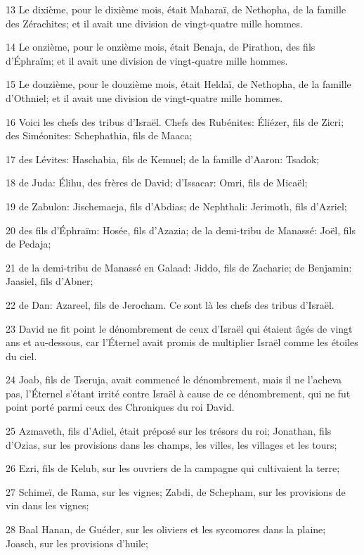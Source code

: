 \par 13 Le dixième, pour le dixième mois, était Maharaï, de Nethopha, de la famille des Zérachites; et il avait une division de vingt-quatre mille hommes.
\par 14 Le onzième, pour le onzième mois, était Benaja, de Pirathon, des fils d'Éphraïm; et il avait une division de vingt-quatre mille hommes.
\par 15 Le douzième, pour le douzième mois, était Heldaï, de Nethopha, de la famille d'Othniel; et il avait une division de vingt-quatre mille hommes.
\par 16 Voici les chefs des tribus d'Israël. Chefs des Rubénites: Éliézer, fils de Zicri; des Siméonites: Schephathia, fils de Maaca;
\par 17 des Lévites: Haschabia, fils de Kemuel; de la famille d'Aaron: Tsadok;
\par 18 de Juda: Élihu, des frères de David; d'Issacar: Omri, fils de Micaël;
\par 19 de Zabulon: Jischemaeja, fils d'Abdias; de Nephthali: Jerimoth, fils d'Azriel;
\par 20 des fils d'Éphraïm: Hosée, fils d'Azazia; de la demi-tribu de Manassé: Joël, fils de Pedaja;
\par 21 de la demi-tribu de Manassé en Galaad: Jiddo, fils de Zacharie; de Benjamin: Jaasiel, fils d'Abner;
\par 22 de Dan: Azareel, fils de Jerocham. Ce sont là les chefs des tribus d'Israël.
\par 23 David ne fit point le dénombrement de ceux d'Israël qui étaient âgés de vingt ans et au-dessous, car l'Éternel avait promis de multiplier Israël comme les étoiles du ciel.
\par 24 Joab, fils de Tseruja, avait commencé le dénombrement, mais il ne l'acheva pas, l'Éternel s'étant irrité contre Israël à cause de ce dénombrement, qui ne fut point porté parmi ceux des Chroniques du roi David.
\par 25 Azmaveth, fils d'Adiel, était préposé sur les trésors du roi; Jonathan, fils d'Ozias, sur les provisions dans les champs, les villes, les villages et les tours;
\par 26 Ezri, fils de Kelub, sur les ouvriers de la campagne qui cultivaient la terre;
\par 27 Schimeï, de Rama, sur les vignes; Zabdi, de Schepham, sur les provisions de vin dans les vignes;
\par 28 Baal Hanan, de Guéder, sur les oliviers et les sycomores dans la plaine; Joasch, sur les provisions d'huile;
